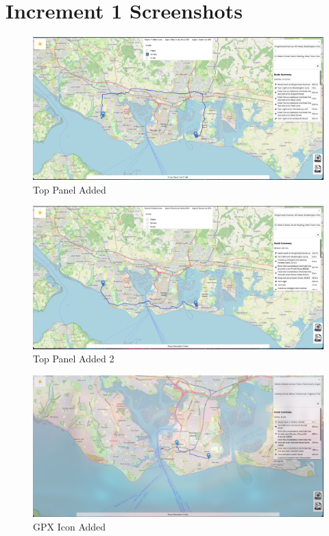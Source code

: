 \chapter{Increment 1 Screenshots}

\begin{figure}[!ht]
    \centering
    \includegraphics[width=425px]{figures/Progress Images/Iteration-1/SR7/SR9 Top Panel added and Avoid functionality implemented Avoid Ferries Example.png}
    \caption{Top Panel Added}
    \label{fig:Top-Panel-added}
\end{figure}

\begin{figure}[!ht]
    \centering
    \includegraphics[width=425px]{figures/Progress Images/Iteration-1/SR7/SR9 Top Panel added and Avoid functionality implemented.png}
    \caption{Top Panel Added 2}
    \label{fig:Top-Panel-added2}
\end{figure}

\begin{figure}[!ht]
    \centering
    \includegraphics[width=425px]{figures/Progress Images/Iteration-1/SR12/SR13 GPX Icon Added (bottom right).png}
    \caption{GPX Icon Added}
    \label{fig:gpx-icon-added}
\end{figure}

